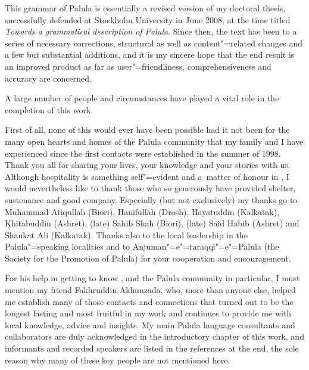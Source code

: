 \begin{refsection}

This grammar of Palula is essentially a revised version of my doctoral thesis, successfully defended at Stockholm University in June 2008, at the time titled \textit{Towards a grammatical description of Palula}. Since then, the text has been  to a series of necessary corrections, structural as well as content"=related changes and a few but substantial additions, and it is my sincere hope that the end result is an improved product as far as user"=friendliness, comprehensiveness and accuracy are concerned.


A large number of people and circumstances have played a vital role in the completion of this work.


First of all, none of this would ever have been possible had it not been for the many open hearts and homes of the Palula community that my family and I have experienced since the first contacts were established in the summer of 1998. Thank you all for sharing your lives, your knowledge and your stories with us. Although hospitality is something self"=evident and a~matter of honour in \iliChitral, I would nevertheless like to thank those who so generously have provided shelter, sustenance and good company. Especially (but not exclusively) my thanks go to Muhammad Atiqullah (Biori), Hanifullah (Drosh), Hayatuddin (Kalkatak), Khitabuddin (Ashret), (late) Sahib Shah (Biori), (late) Said Habib (Ashret) and Shaukat Ali (Kalkatak). Thanks also to the local leadership in the Palula"=speaking localities and to Anjuman"=e"=taraqqi"=e"=Palula (the Society for the Promotion of Palula) for your cooperation and encouragement. 


For his help in getting to know \iliChitral, and the Palula community in particular, I must mention my friend Fakhruddin Akhunzada, who, more than anyone else, helped me establish many of those contacts and connections that turned out to be the longest lasting and most fruitful in my work and continues to provide me with local knowledge, advice and insights. My main Palula language consultants and collaborators are duly acknowledged in the introductory chapter of this work, and informants and recorded speakers are listed in the references at the end, the sole reason why many of these key people are not mentioned here.



\end{refsection}
